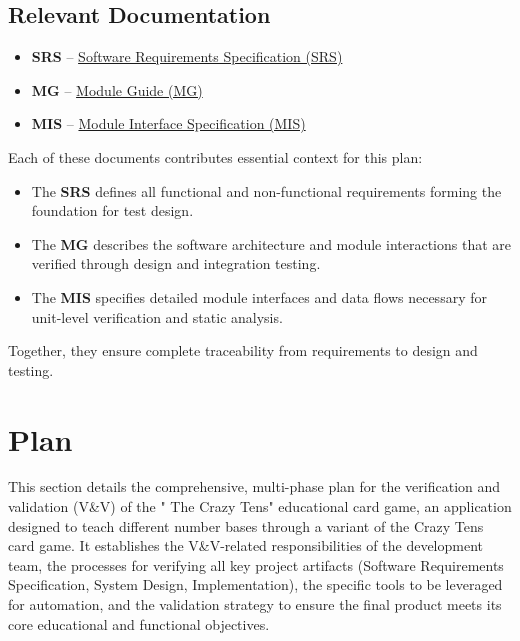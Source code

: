 \documentclass[12pt, titlepage]{article}
\begin{document}
\subsection{Relevant Documentation}
\begin{itemize}
    \item \textbf{SRS} – \href{https://github.com/The-Crazy-Four-Games/Crazy_1-0s_Game/blob/main/docs/SRS-Volere/SRS.pdf}{Software Requirements Specification (SRS)}  
    \item \textbf{MG} – \href{https://github.com/The-Crazy-Four-Games/Crazy_1-0s_Game/blob/main/docs/Design/SoftArchitecture/MG.pdf}{Module Guide (MG)}  
    \item \textbf{MIS} – \href{https://github.com/The-Crazy-Four-Games/Crazy_1-0s_Game/blob/main/docs/Design/SoftDetailedDes/MIS.pdf}{Module Interface Specification (MIS)}  
\end{itemize}

Each of these documents contributes essential context for this plan:
\begin{itemize}
    \item The \textbf{SRS} defines all functional and non-functional requirements forming the foundation for test design.  
    \item The \textbf{MG} describes the software architecture and module interactions that are verified through design and integration testing.  
    \item The \textbf{MIS} specifies detailed module interfaces and data flows necessary for unit-level verification and static analysis.  
\end{itemize}
Together, they ensure complete traceability from requirements to design and testing.


\section{Plan}
This section details the comprehensive, multi-phase plan for the verification and validation (V\&V) of the " The Crazy Tens" educational card game, an application designed to teach different number bases through a variant of the Crazy Tens card game. It establishes the V\&V-related responsibilities of the development team, the processes for verifying all key project artifacts (Software Requirements Specification, System Design, Implementation), the specific tools to be leveraged for automation, and the validation strategy to ensure the final product meets its core educational and functional objectives.   
\end{document}
